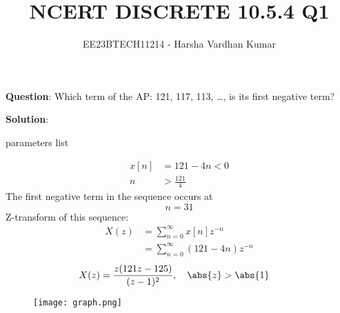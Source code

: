 \documentclass[journal,12pt,twocolumn]{IEEEtran}
\title{NCERT DISCRETE 10.5.4 Q1}
\author{EE23BTECH11214 - Harsha Vardhan Kumar}
\begin{document}
\maketitle

\noindent \textbf{Question}:
Which term of the AP: 121, 117, 113, \ldots, is its first negative term?

\textbf{Solution}:
\begin{table}[htbp]
\centering

\caption{parameters list}
\end{table}

\begin{align}
x[n] &= 121 - 4n < 0 \\
n &> \frac{121}{4} 
\end{align}
The first negative term in the sequence occurs at 
\[ n = 31 \]
Z-transform of this sequence:
\begin{align}
X(z) &= \sum_{n=0}^{\infty} x[n]z^{-n} \\
&= \sum_{n=0}^{\infty} (121 - 4n)z^{-n}
\end{align}
\begin{align}
    X(z) &= \frac{z(121z - 125)}{(z - 1)^2} , \quad \abs{z}>\abs{1}
\end{align}
\pagebreak
\begin{figure}[!ht] 
\centering
\texttt{[image: graph.png]}
\label{fig:Graph1}
\end{figure}
\end{document}
